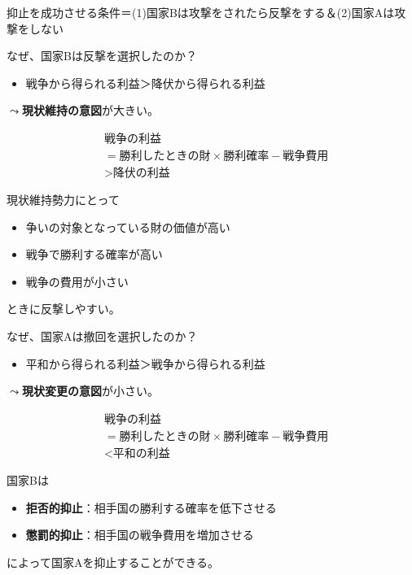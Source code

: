 \documentclass[
  xelatex,
  ja=standard]{bxjsarticle}
\providecommand{\tightlist}{%
  \setlength{\itemsep}{0pt}\setlength{\parskip}{0pt}}\usepackage{longtable,booktabs,array}
\begin{document}
抑止を成功させる条件＝(1)国家Bは攻撃をされたら反撃をする＆(2)国家Aは攻撃をしない

なぜ、国家Bは反撃を選択したのか？

\begin{itemize}
\tightlist
\item
  戦争から得られる利益＞降伏から得られる利益
\end{itemize}

\(\leadsto\)\textbf{現状維持の意図}が大きい。

\[
\begin{split}
&\textrm{戦争の利益} \\
&= \textrm{勝利したときの財} \times \textrm{勝利確率} - \textrm{戦争費用} \\
&> \textrm{降伏の利益}
\end{split}
\]

現状維持勢力にとって

\begin{itemize}
\tightlist
\item
  争いの対象となっている財の価値が高い
\item
  戦争で勝利する確率が高い
\item
  戦争の費用が小さい
\end{itemize}

ときに反撃しやすい。

なぜ、国家Aは撤回を選択したのか？

\begin{itemize}
\tightlist
\item
  平和から得られる利益＞戦争から得られる利益
\end{itemize}

\(\leadsto\)\textbf{現状変更の意図}が小さい。

\[
\begin{split}
&\textrm{戦争の利益} \\
&= \textrm{勝利したときの財} \times \textrm{勝利確率} - \textrm{戦争費用} \\
&< \textrm{平和の利益}
\end{split}
\]

国家Bは

\begin{itemize}
\tightlist
\item
  \textbf{拒否的抑止}：相手国の勝利する確率を低下させる
\item
  \textbf{懲罰的抑止}：相手国の戦争費用を増加させる
\end{itemize}

によって国家Aを抑止することができる。
\end{document}
